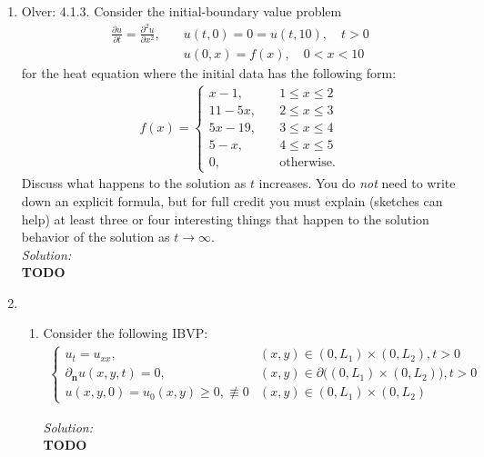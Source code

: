 \documentclass[10pt]{amsart}
\theoremstyle{nonumberplain}
\begin{document}
\begin{enumerate}[label={\bf {\arabic*}:}]
\item Olver: 4.1.3. Consider the initial-boundary value problem
\begin{align*}
\frac {\partial u} {\partial t} = \frac {\partial^2 u}{ \partial x^2}, \quad &u(t, 0) = 0 = u(t, 10), \quad t > 0 \\
	& u(0, x) = f(x), \quad 0 < x < 10
\end{align*}
for the heat equation where the initial data has the following form:
\begin{align*}
f(x) = \begin{cases}
x - 1, \quad &1 \leq x \leq 2 \\
11 - 5x, \quad & 2 \leq x \leq 3 \\
5x - 19, \quad & 3 \leq x \leq 4 \\
5 - x, \quad & 4 \leq x \leq 5 \\
0, \quad &\text{otherwise}.
\end{cases}
\end{align*}
Discuss what happens to the solution as $t$ increases.
You do \textit{not} need to write down an explicit formula, but for full credit you must explain (sketches can help) at least three or four interesting things that happen to the solution behavior of the solution as $t \rightarrow \infty$.
\\

\noindent
\textit{Solution:} \\
\textbf{TODO} \\

\newpage

\item
\begin{enumerate}
\item Consider the following IBVP:
\begin{align*}
\begin{cases}
u_t = u_{xx}, &(x, y) \in (0, L_1) \times (0, L_2), t > 0 \\
\partial_{\bm n} u(x, y, t) = 0, &(x, y) \in \partial \big( (0, L_1) \times (0, L_2) \big), t > 0 \\
u(x, y, 0) = u_0(x, y) \geq 0, \not \equiv 0 &(x, y) \in (0, L_1) \times (0, L_2)
\end{cases}
\end{align*}

\noindent
\textit{Solution:} \\
\textbf{TODO} \\


\end{enumerate}
\end{enumerate}
\end{document}
